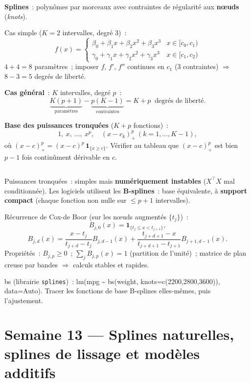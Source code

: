 \documentclass[11pt,letterpaper]{article}
\newcommand{\bloc}[1]{\subsection*{\fbox{Bloc #1}}}
\newcommand{\semaine}[2]{\newpage\section{Semaine #1 --- #2}}
\begin{document}
\begin{tableau}
\textbf{Splines}~: polynômes par morceaux avec contraintes de régularité aux
\textbf{n\oe uds} (\textit{knots}).

Cas simple ($K=2$ intervalles, degré 3)~:
$$f(x) = \begin{cases}
\beta_0 + \beta_1x + \beta_2x^2 + \beta_3x^3 & x\in[c_0,c_1)\\
\gamma_0 + \gamma_1x + \gamma_2x^2 + \gamma_3x^3 & x\in[c_1,c_2)
\end{cases}$$
$4+4 = 8$ paramètres~; imposer $f$, $f'$, $f''$ continues en $c_1$
($3$ contraintes) $\Rightarrow$ $8 - 3 = 5$ degrés de liberté.

\textbf{Cas général}~: $K$ intervalles, degré $p$~:
$$\underbrace{K(p+1)}_{\text{paramètres}} - \underbrace{p(K-1)}_{\text{contraintes}}
= K + p \ \text{ degrés de liberté}.$$

\textbf{Base des puissances tronquées} ($K+p$ fonctions)~:
$$1,\ x,\ \ldots,\ x^p,\quad (x-c_k)_+^p \ (k = 1,\ldots,K-1),$$
où $(x-c)_+^p = (x-c)^p\,\mathbf{1}_{\{x\geq c\}}$.
Vérifier au tableau que $(x-c)_+^p$ est bien $p-1$ fois continûment dérivable
en $c$.
\end{tableau}

\bloc{3 --- B-splines}

\begin{tableau}
Puissances tronquées~: simples mais \textbf{numériquement instables}
($X^\top X$ mal conditionnée). Les logiciels utilisent les \textbf{B-splines}~:
base équivalente, à \textbf{support compact} (chaque fonction non nulle sur
$\leq p+1$ intervalles).

Récurrence de Cox-de Boor (sur les n\oe uds augmentés $\{t_j\}$)~:
$$B_{j,0}(x) = \mathbf{1}_{\{t_j\leq x < t_{j+1}\}},$$
$$B_{j,d}(x) = \frac{x-t_j}{t_{j+d}-t_j}B_{j,d-1}(x)
+ \frac{t_{j+d+1}-x}{t_{j+d+1}-t_{j+1}}B_{j+1,d-1}(x).$$
Propriétés~: $B_{j,p}\geq0$~; $\sum_j B_{j,p}(x) = 1$ (partition de l'unité)~;
matrice de plan creuse par bandes $\Rightarrow$ calculs stables et rapides.
\end{tableau}

\begin{momentR}
\textsf{bs} (librairie \texttt{splines})~:
\textsf{lm(mpg \textasciitilde{} bs(weight, knots=c(2200,2800,3600)), data=Auto)}.
Tracer les fonctions de base B-splines elles-mêmes, puis l'ajustement.
\end{momentR}

\semaine{13}{Splines naturelles, splines de lissage et modèles additifs}
\end{document}
